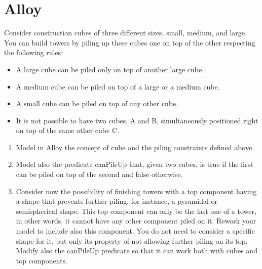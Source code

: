 \documentclass[12pt, a4paper]{report}
\begin{document}
    \section{Alloy}
        Consider construction cubes of three different sizes, small, medium, and large. You can build towers by piling up these cubes one on top of the other respecting the following rules:
        \begin{itemize}
            \item A large cube can be piled only on top of another large cube.
            \item A medium cube can be piled on top of a large or a medium cube.
            \item A small cube can be piled on top of any other cube.
            \item It is not possible to have two cubes, A and B, simultaneously positioned right on top of the same other cube C. 
        \end{itemize}
        \begin{enumerate}
            \item Model in Alloy the concept of cube and the piling constraints defined above.
            \item Model also the predicate canPileUp that, given two cubes, is true if the first can be piled on top of the second and false otherwise.
            \item Consider now the possibility of finishing towers with a top component having a shape that prevents further piling, for instance, a pyramidal 
                or semispherical shape. This top component can only be the last one of a tower, in other words, it cannot have any other component piled on it.
                Rework your model to include also this component. You do not need to consider a specific shape for it, but only its property of not allowing further 
                piling on its top. Modify also the canPileUp predicate so that it can work both with cubes and top components.
        \end{enumerate}
\end{document}
